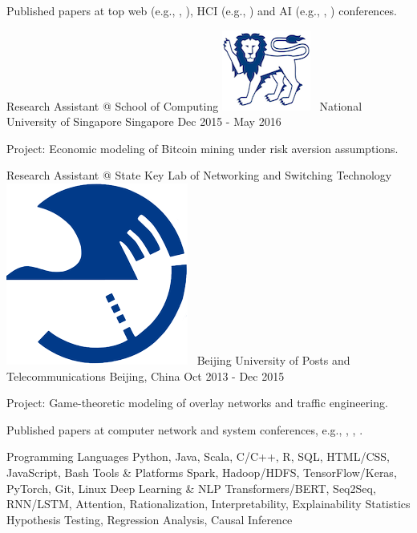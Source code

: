 \documentclass[letterpaper]{awesome-cv}
\begin{document}
\begin{cventries}
{\begin{cvitems}
        \item {Published  papers at top web (e.g., , ), HCI (e.g., ) and AI (e.g., , ) conferences.}
      \end{cvitems}
    }
  \cventry
    {Research Assistant @ School of Computing}
    {\includegraphics[height=0.017\textwidth]{../images/logos/nus.png}~ National University of Singapore}
    {Singapore}
    {Dec 2015 - May 2016}
    {
      \begin{cvitems}
        \item {Project: Economic modeling of Bitcoin mining under risk aversion assumptions.}
      \end{cvitems}
    }
  \cventry
    {Research Assistant @ State Key Lab of Networking and Switching Technology}
    {\includegraphics[height=0.017\textwidth]{../images/logos/bupt.png}~ Beijing University of Posts and Telecommunications}
    {Beijing, China}
    {Oct 2013 - Dec 2015}
    {
      \begin{cvitems}
        \item {Project: Game-theoretic modeling of overlay networks and traffic engineering.}
        \item {Published papers at computer network and system conferences, e.g., , , .}
      \end{cvitems}
    }
\end{cventries}

\addvspace{0.2ex}
\begin{cventries}
 \cvskillnew
    {Programming Languages}
    {Python, Java, Scala, C/C++, R, SQL, HTML/CSS, JavaScript, Bash}
  \cvskillnew
    {Tools \& Platforms}
    {Spark, Hadoop/HDFS, TensorFlow/Keras, PyTorch, Git, Linux}
  \cvskillnew
    {Deep Learning \& NLP}
    {Transformers/BERT, Seq2Seq, RNN/LSTM, Attention, Rationalization, Interpretability, Explainability}
  \cvskillnew
    {Statistics}
    {Hypothesis Testing, Regression Analysis, Causal Inference}
\end{cventries}
\end{document}
